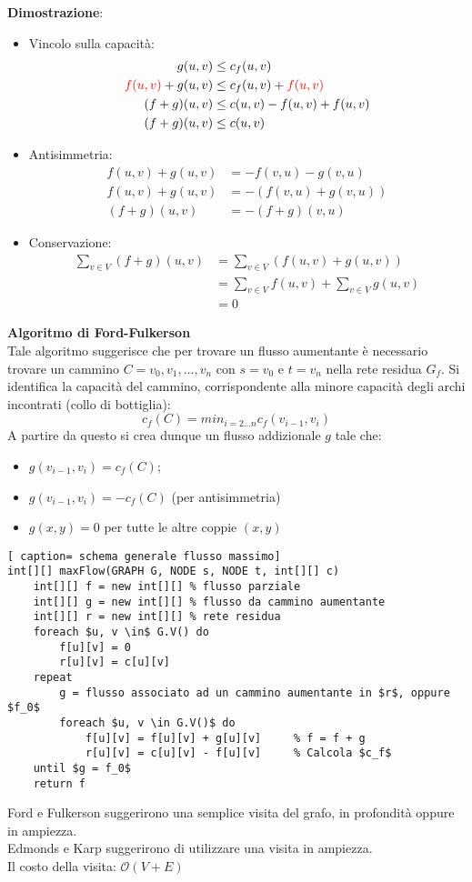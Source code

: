 \documentclass[../cheatSheetAlgoritmi.tex]{subfiles}
\begin{document}
\bigskip
\textbf{Dimostrazione}:
\begin{itemize}
	\item Vincolo sulla capacità:
		\begin{align*}
		g(u, v) & \leq c_f(u, v) \\
		\textcolor{red}{f(u, v)} + g(u, v) & \leq c_f(u, v) + \textcolor{red}{f(u, v)} \\
		(f + g)(u, v) & \leq c(u, v) - f(u, v) + f(u, v) \\
		(f + g)(u, v) & \leq c(u, v)
		\end{align*}
	\item Antisimmetria:
		\begin{align*}
		f(u, v) + g(u, v) & = -f(v, u) - g(v, u) \\
		f(u, v) + g(u, v) & = -(f(v, u) + g(v, u)) \\
		(f+g)(u, v) & = - (f + g)(v, u)
		\end{align*}
	\item Conservazione:
		\begin{align*}
		\sum_{v \in V}(f + g)(u, v) & = 	\sum_{v \in V}(f(u, v) + g(u, v)) \\
		& = \sum_{v \in V}f(u, v) +  \sum_{v \in V}g(u, v)\\
		& = 0
		\end{align*}
\end{itemize}
\textbf{Algoritmo di Ford-Fulkerson} \\
Tale algoritmo suggerisce che per trovare un flusso aumentante è necessario trovare un cammino $C = v_0, v_1, ..., v_n$ con $s = v_0$ e $t = v_n$ nella rete residua $G_f$.
Si identifica la capacità del cammino, corrispondente alla minore capacità degli archi incontrati (collo di bottiglia):
\begin{equation*}
  	c_f(C) = min_{i = 2...n} c_f(v_{i-1}, v_i)
\end{equation*}
A partire da questo si crea dunque un flusso addizionale $g$ tale che:
\begin{itemize}
	\item $g(v_{i-1}, v_i) = c_f(C)$;
	\item $g(v_{i-1}, v_i) = - c_f(C)$ (per antisimmetria)
	\item $g(x, y) = 0$  per tutte le altre coppie $(x, y)$
\end{itemize}
 \begin{lstlisting}[ caption= schema generale flusso massimo]
int[][] maxFlow(GRAPH G, NODE s, NODE t, int[][] c)
	int[][] f = new int[][]	% flusso parziale
	int[][] g = new int[][] % flusso da cammino aumentante
	int[][] r = new int[][] % rete residua
	foreach $u, v \in$ G.V() do
		f[u][v] = 0
		r[u][v] = c[u][v]
	repeat
		g = flusso associato ad un cammino aumentante in $r$, oppure $f_0$
		foreach $u, v \in G.V()$ do
			f[u][v] = f[u][v] + g[u][v] 	% f = f + g
			r[u][v] = c[u][v] - f[u][v] 	% Calcola $c_f$
	until $g = f_0$
	return f
\end{lstlisting}
Ford e Fulkerson suggerirono una semplice visita del grafo, in profondità oppure in ampiezza. \\Edmonds e Karp suggerirono di utilizzare una visita in ampiezza. \\
Il costo della visita: $\mathcal{O}(V + E)$
\end{document}
